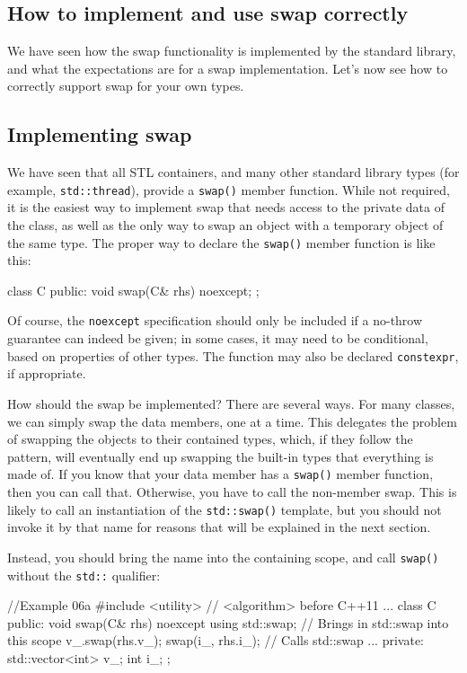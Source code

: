 \subsection{How to implement and use swap correctly}

We have seen how the swap functionality is implemented by the standard library, and what the expectations are for a swap implementation. Let's now see how to correctly support swap for your own types.

\subsection{Implementing swap}

We have seen that all STL containers, and many other standard library types (for example, \texttt{std::thread}), provide a \texttt{swap()} member function. While not required, it is the easiest way to implement swap that needs access to the private data of the class, as well as the only way to swap an object with a temporary object of the same type. The proper way to declare the \texttt{swap()} member function is like this:

\begin{code}
class C {
  public:
  void swap(C& rhs) noexcept;
};
\end{code}

Of course, the \texttt{noexcept} specification should only be included if a no-throw guarantee can indeed be given; in some cases, it may need to be conditional, based on properties of other types. The function may also be declared \texttt{constexpr}, if appropriate.

How should the swap be implemented? There are several ways. For many classes, we can simply swap the data members, one at a time. This delegates the problem of swapping the objects to their contained types, which, if they follow the pattern, will eventually end up swapping the built-in types that everything is made of. If you know that your data member has a \texttt{swap()} member function, then you can call that. Otherwise, you have to call the non-member swap. This is likely to call an instantiation of the \texttt{std::swap()} template, but you should not invoke it by that name for reasons that will be explained in the next section.

Instead, you should bring the name into the containing scope, and call \texttt{swap()} without the \texttt{std::} qualifier:

\begin{code}
//Example 06a
#include <utility>    // <algorithm> before C++11
...
class C {
  public:
  void swap(C& rhs) noexcept {
    using std::swap;    // Brings in std::swap into this scope
    v_.swap(rhs.v_);
    swap(i_, rhs.i_);    // Calls std::swap
  }
  ...
  private:
  std::vector<int> v_;
  int i_;
};
\end{code}

